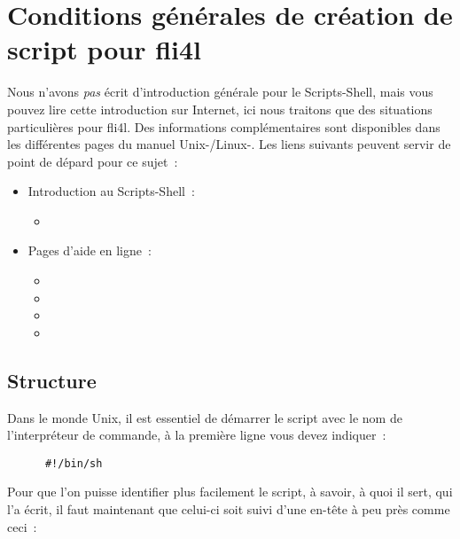 
\section{Conditions générales de création de script pour fli4l}

Nous n'avons \emph{pas} écrit d'introduction générale pour le Scripts-Shell,
mais vous pouvez lire cette introduction sur Internet, ici nous traitons que des
situations particulières pour fli4l. Des informations complémentaires sont disponibles
dans les différentes pages du manuel Unix-/Linux-. Les liens suivants peuvent servir
de point de dépard pour ce sujet~:

\begin{itemize}
\item Introduction au Scripts-Shell~:
  \begin{itemize}
  \item {}
  \end{itemize}
\item Pages d'aide en ligne~:
   \begin{itemize}
   \item {}
   \item {}
   \item {}
   \item {}
   \end{itemize}
\end{itemize}


\subsection{Structure}

    Dans le monde Unix, il est essentiel de démarrer le script avec le nom de
    l'interpréteur de commande, à la première ligne vous devez indiquer~:

\begin{example}
\begin{verbatim}
      #!/bin/sh
\end{verbatim}
\end{example}

    Pour que l'on puisse identifier plus facilement le script, à savoir, à
    quoi il sert, qui l'a écrit, il faut maintenant que celui-ci soit suivi
    d'une en-tête à peu près comme ceci~:

